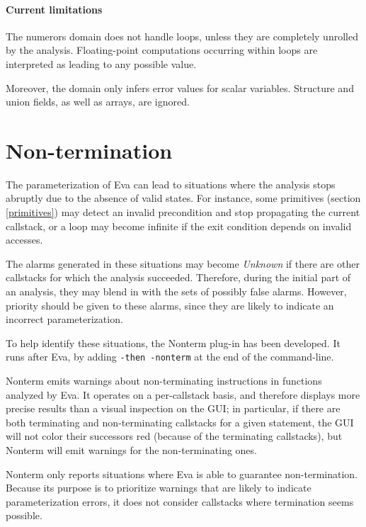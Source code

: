 \documentclass[web]{frama-c-book}
\newcommand{\Eva}{\textsf{Eva}}
\begin{document}
\paragraph{Current limitations}

The numerors domain does not handle loops, unless they are completely unrolled
by the analysis. Floating-point computations occurring within loops are
interpreted as leading to any possible value.

Moreover, the domain only infers error values for scalar variables. Structure
and union fields, as well as arrays, are ignored.

\section{Non-termination}\label{nonterm}

The parameterization of \Eva{} can lead to situations where the
analysis stops abruptly due to the absence of valid states. For instance,
some primitives (section \ref{primitives}) may detect an invalid
precondition and stop propagating the current callstack, or a loop may
become infinite if the exit condition depends on invalid accesses.

The alarms generated in these situations may become {\em Unknown} if
there are other callstacks for which the analysis succeeded. Therefore,
during the initial part of an analysis, they may blend in with the sets
of possibly false alarms. However, priority should be given to these
alarms, since they are likely to indicate an incorrect parameterization.

To help identify these situations, the \textsf{Nonterm} plug-in has been
developed. It runs after \Eva{}, by adding \verb|-then -nonterm|
at the end of the command-line.

\textsf{Nonterm} emits warnings about non-terminating instructions in functions
analyzed by \Eva{}. It operates on a per-callstack basis, and therefore
displays more precise results than a visual inspection on the GUI;
in particular, if there are both terminating and non-terminating callstacks for
a given statement, the GUI will not color their successors red
(because of the terminating callstacks), but \textsf{Nonterm} will emit warnings
for the non-terminating ones.

\textsf{Nonterm} only reports situations where \Eva{} is able to
guarantee non-termination. Because its purpose is to prioritize warnings
that are likely to indicate parameterization errors,
it does not consider callstacks where termination seems possible.
\end{document}
